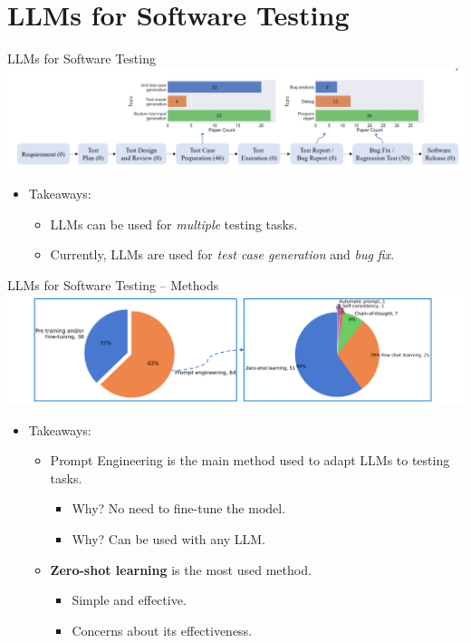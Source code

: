 \documentclass[presentation, 10pt]{beamer}\mode<presentation>{\usetheme{AMSBolognaFC}}
\begin{document}
\section{LLMs for Software Testing}
\begin{frame}{LLMs for Software Testing~\cite{wang2024software}}
\includegraphics[width=\textwidth]{img/overview.png}
\begin{itemize}
	\item Takeaways:
	\begin{itemize}
		\item LLMs can be used for \emph{multiple} testing tasks.
		\item Currently, LLMs are used for \emph{test case generation} and \emph{bug fix}.
	\end{itemize}
\end{itemize}
\end{frame}
\begin{frame}{LLMs for Software Testing -- Methods}
\includegraphics[width=\textwidth]{img/how-llm-are-used.png}
\begin{itemize}
	\item Takeaways:
	\begin{itemize}
		\item Prompt Engineering is the main method used to adapt LLMs to testing tasks.
		\begin{itemize}
			\item Why? No need to fine-tune the model.
			\item Why? Can be used with any LLM.
		\end{itemize}
		\item \textbf{Zero-shot learning} is the most used method.
		\begin{itemize}
			\item Simple and effective.
			\item Concerns about its effectiveness.
		\end{itemize}
	\end{itemize}
\end{itemize}
\end{frame}
\end{document}
